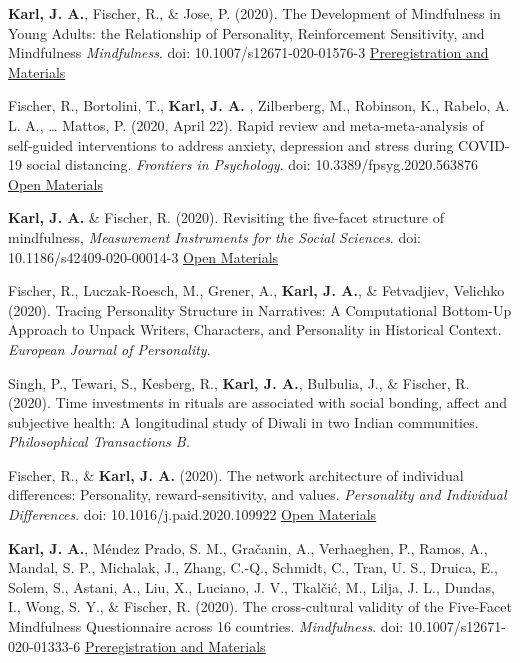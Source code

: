 \documentclass[11pt]{article} %
\begin{document}
\begin{hangparas}{2em}{1}


\textbf{Karl, J. A.},  Fischer, R., \& Jose, P. (2020). The Development of Mindfulness in Young Adults: the Relationship of Personality, Reinforcement Sensitivity, and Mindfulness \emph{Mindfulness}. doi: 10.1007/s12671-020-01576-3 \href{https://osf.io/8kufq/}{Preregistration and Materials}


Fischer, R., Bortolini, T., \textbf{Karl, J. A.} , Zilberberg, M., Robinson, K., Rabelo, A. L. A., … Mattos, P. (2020, April 22). Rapid review and meta-meta-analysis of self-guided interventions to address anxiety, depression and stress during COVID-19 social distancing. \emph{Frontiers in Psychology}. doi: 10.3389/fpsyg.2020.563876 \href{https://osf.io/fpx4s/}{Open Materials} 

\textbf{Karl, J. A.} \& Fischer, R. (2020). Revisiting the five-facet structure of mindfulness, \emph{ Measurement Instruments for the Social Sciences}. doi: 10.1186/s42409-020-00014-3 \href{https://osf.io/k2m35/}{Open Materials} 

Fischer, R., Luczak-Roesch, M., Grener, A., \textbf{Karl, J. A.}, \& Fetvadjiev, Velichko (2020). Tracing Personality Structure in Narratives: A Computational Bottom-Up Approach to Unpack Writers, Characters, and Personality in Historical Context. \emph{European Journal of Personality}.

Singh, P., Tewari, S., Kesberg, R., \textbf{Karl, J. A.}, Bulbulia, J., \&   Fischer, R. (2020). Time investments in rituals are associated with social   bonding, affect and subjective health: A longitudinal study of Diwali in two   Indian communities. \emph{Philosophical Transactions B.}

Fischer, R., \& \textbf{Karl, J. A.} (2020). The network architecture of individual differences: Personality, reward-sensitivity, and values. \emph{Personality and Individual Differences}. doi: 10.1016/j.paid.2020.109922 \href{https://osf.io/wf26d/?view_only=e1e7e704b447406bbafafa755d090513}{Open Materials} 

\textbf{Karl, J. A.}, Méndez Prado, S. M., Gračanin, A., Verhaeghen, P., Ramos, A., Mandal, S. P., Michalak, J., Zhang, C.-Q., Schmidt, C., Tran, U. S., Druica, E., Solem, S., Astani, A., Liu, X., Luciano, J. V., Tkalčić, M., Lilja, J. L., Dundas, I., Wong, S. Y., \& Fischer, R. (2020). The cross-cultural validity of the Five-Facet Mindfulness Questionnaire across 16 countries. \emph{Mindfulness}. doi: 10.1007/s12671-020-01333-6 \href{ https://osf.io/nftxb/}{Preregistration and Materials}


\end{hangparas}
\end{document}
